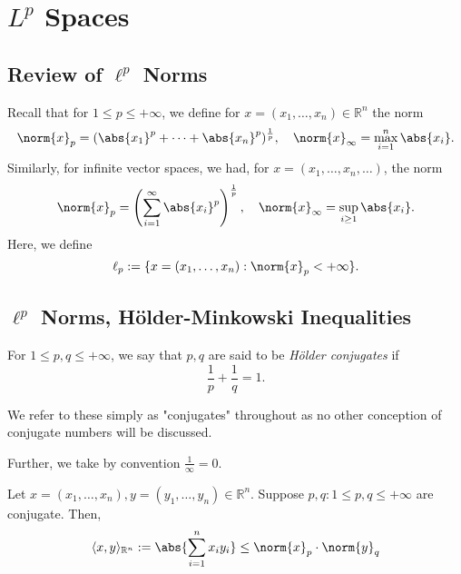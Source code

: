 \newpage
\section{\texorpdfstring{$L^p$ Spaces}{Lp Spaces}}

\subsection{Review of \texorpdfstring{$\ell^p$ Norms}{lp Norms}}

\begin{remark}
    Recall that for $1 \leq p \leq + \infty$, we define for $x = (x_1, \dots, x_n) \in \mathbb{R}^n$ the norm \[
    \norm{x}_p = (\abs{x_1}^p + \cdots + \abs{x_n}^p)^{\frac{1}{p}}, \quad \norm{x}_{\infty} = \max_{i=1}^{n} \abs{x_i}.
    \]
    Similarly, for infinite vector spaces, we had, for $x = (x_1, \dots, x_n, \dots)$, the norm \[
    \norm{x}_p = \left(\sum_{i=1}^\infty\abs{x_i}^p\right)^{\frac{1}{p}}, \quad \norm{x}_\infty = \sup_{i \geq 1} \abs{x_i}.
    \]
    Here, we define \[
        \ell_p := \{x = (x_1, \dots, x_n) : \norm{x}_p < + \infty\}.
    \]
\end{remark}

\subsection{\texorpdfstring{$\ell^p$ Norms}{lp Norms}, Hölder-Minkowski Inequalities}

\begin{definition}
    For $1 \leq p, q \leq + \infty$, we say that $p, q$ are said to be \emph{Hölder conjugates} if \[
    \frac{1}{p} + \frac{1}{q} = 1.    
    \]
\end{definition}

\begin{remark}
    We refer to these simply as "conjugates" throughout as no other conception of conjugate numbers will be discussed.

    Further, we take by convention $\frac{1}{\infty} = 0$.
\end{remark}

\begin{proposition}\label{prop:holdersinequality}
    Let $x = (x_1, \dots, x_n), y = (y_1, \dots, y_n) \in \mathbb{R}^n$. Suppose $p, q : 1 \leq p, q \leq + \infty$ are conjugate. Then, \[
   \langle x, y \rangle_{\mathbb{R}^n} := \abs{\sum_{i=1}^n x_i y_i} \leq \norm{x}_p \cdot \norm{y}_q
    \]
\end{proposition}

